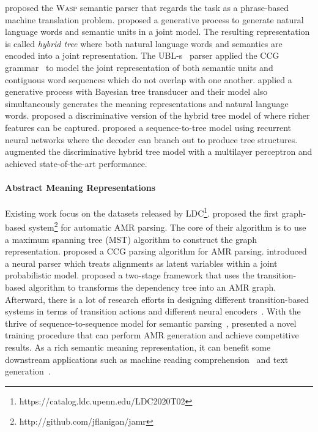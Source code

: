 \citet{wong2006learning} proposed the \textsc{Wasp} semantic parser 
that regards the task as a phrase-based machine translation problem.
\citet{lu2008generative} proposed a generative process to generate natural language words and semantic units in a joint model. 
The resulting representation is called \textit{hybrid tree} where both natural language words and semantics are encoded into a joint representation. 
The \textsc{UBL}-s~\cite{kwiatkowski2010inducing} parser applied the CCG grammar~\cite{steedman1996surface} to model the joint representation of both semantic units and contiguous word sequences which do not overlap with one another. 
\citet{jones2012semantic} applied a generative process with Bayesian tree transducer and their model also simultaneously generates the meaning representations and natural language words. 
\citet{lu2014semantic,lu2015constrained} proposed a discriminative version of the hybrid tree model of \cite{lu2008generative} where richer features can be captured. 
\citet{dong2016language} proposed a sequence-to-tree model using recurrent neural networks where the decoder can branch out to produce tree structures. 
\citet{susanto2017semantic} augmented the discriminative {hybrid tree} model with a multilayer perceptron and achieved state-of-the-art performance. 


\paragraph{Abstract Meaning Representations}
Existing work focus on the datasets released by LDC\footnote{https://catalog.ldc.upenn.edu/LDC2020T02}. 
\citet{flanigan2014discriminative} proposed the first graph-based system\footnote{http://github.com/jflanigan/jamr}  for automatic AMR parsing. 
The core of their algorithm is to use a maximum spanning tree (MST) algorithm to construct the graph representation.  
\citet{artzi2015broad} proposed a CCG parsing algorithm for AMR parsing.
\citet{lyu2018amr} introduced a neural parser which treats alignments as latent variables within a joint probabilistic model. 
\citet{wang2015transition}  proposed a two-stage framework that uses the transition-based algorithm to transforms the dependency tree into an AMR graph. 
Afterward, there is a lot of research efforts in designing different transition-based systems in terms of transition actions and different neural encoders~\cite{wang2015boosting,wang2016camr,misra2016neural,damonte2017incremental,vilares2018transition}.
With the thrive of sequence-to-sequence model for semantic parsing~\cite{dong2016language}, \citet{konstas2017neural} presented a novel training procedure  that can perform AMR generation and achieve competitive results.  
As a rich semantic meaning representation, it can benefit some downstream applications such as machine reading comprehension~\cite{sachan2016machine} and text generation~\cite{song2016amr}.


